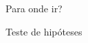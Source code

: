 \begin{frame}{Para onde ir?}

\hfill%
\begin{wideitemize}
	\item Teste de hipóteses
\end{wideitemize}
\end{frame}
